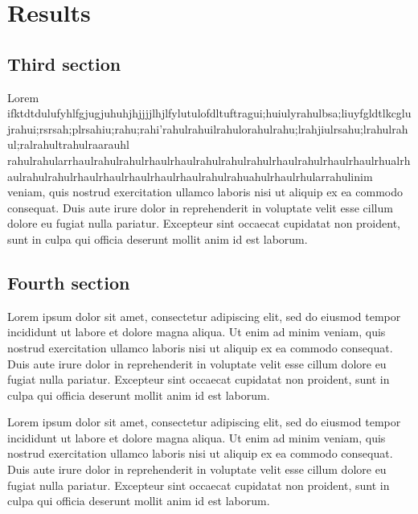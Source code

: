 \chapter{Results}

\section{Third section}
Lorem ifktdtdulufyhlfgjugjuhuhjhjjjjlhjlfylutulofdltuftragui;huiulyrahulbsa;liuyfgldtlkcglujrahui;rsrsah;plrsahiu;rahu;rahi'rahulrahuilrahulorahulrahu;lrahjiulrsahu;lrahulrahul;ralrahultrahulraarauhl rahulrahularrhaulrahulrahulrhaulrhaulrahulrahulrahulrhaulrahulrhaulrhaulrhualrhaulrahulrahulrhaulrhaulrhaulrhaulrhaulrahulrahuahulrhaulrhularrahulinim veniam, quis nostrud exercitation ullamco laboris nisi ut aliquip ex ea commodo consequat. Duis aute irure dolor in reprehenderit in voluptate velit esse cillum dolore eu fugiat nulla pariatur. Excepteur sint occaecat cupidatat non proident, sunt in culpa qui officia deserunt mollit anim id est laborum.

\section{Fourth section}
Lorem ipsum dolor sit amet, consectetur adipiscing elit, sed do eiusmod tempor incididunt ut labore et dolore magna aliqua. Ut enim ad minim veniam, quis nostrud exercitation ullamco laboris nisi ut aliquip ex ea commodo consequat. Duis aute irure dolor in reprehenderit in voluptate velit esse cillum dolore eu fugiat nulla pariatur. Excepteur sint occaecat cupidatat non proident, sunt in culpa qui officia deserunt mollit anim id est laborum.

Lorem ipsum dolor sit amet, consectetur adipiscing elit, sed do eiusmod tempor incididunt ut labore et dolore magna aliqua. Ut enim ad minim veniam, quis nostrud exercitation ullamco laboris nisi ut aliquip ex ea commodo consequat. Duis aute irure dolor in reprehenderit in voluptate velit esse cillum dolore eu fugiat nulla pariatur. Excepteur sint occaecat cupidatat non proident, sunt in culpa qui officia deserunt mollit anim id est laborum.
